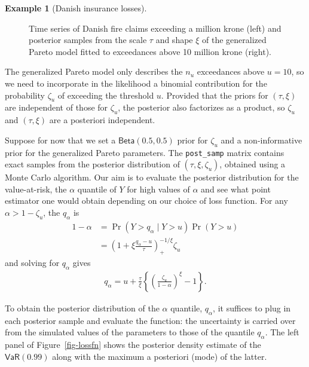 \documentclass[
  11pt,
  letterpaper,
]{scrbook}
\theoremstyle{definition}
\newtheorem{example}{Example}[chapter]
\theoremstyle{definition}
\theoremstyle{definition}
\theoremstyle{plain}
\theoremstyle{remark}
\begin{document}
\begin{example}[Danish insurance
losses]
\begin{figure}[ht!]
{}

\caption{\label{fig-danish}Time series of Danish fire claims exceeding a
million krone (left) and posterior samples from the scale \(\tau\) and
shape \(\xi\) of the generalized Pareto model fitted to exceedances
above 10 million krone (right).}

\end{figure}

The generalized Pareto model only describes the \(n_u\) exceedances
above \(u=10\), so we need to incorporate in the likelihood a binomial
contribution for the probability \(\zeta_u\) of exceeding the threshold
\(u\). Provided that the priors for \((\tau, \xi)\) are independent of
those for \(\zeta_u\), the posterior also factorizes as a product, so
\(\zeta_u\) and \((\tau, \xi)\) are a posteriori independent.

Suppose for now that we set a \(\mathsf{Beta}(0.5, 0.5)\) prior for
\(\zeta_u\) and a non-informative prior for the generalized Pareto
parameters. The \texttt{post\_samp} matrix contains exact samples from
the posterior distribution of \((\tau, \xi, \zeta_u)\), obtained using a
Monte Carlo algorithm. Our aim is to evaluate the posterior distribution
for the value-at-risk, the \(\alpha\) quantile of \(Y\) for high values
of \(\alpha\) and see what point estimator one would obtain depending on
our choice of loss function. For any \(\alpha > 1-\zeta_u\), the
\(q_{\alpha}\) is \begin{align*}
1- \alpha  &= \Pr(Y > q_\alpha \mid Y > u) \Pr(Y > u) 
\\ &= \left(1+\xi \frac{q_{\alpha}-u}{\tau}\right)_{+}^{-1/\xi}\zeta_u
\end{align*} and solving for \(q_{\alpha}\) gives \begin{align*}
q_{\alpha} = u+ \frac{\tau}{\xi} \left\{\left(\frac{\zeta_u}{1-\alpha}\right)^\xi-1\right\}.
\end{align*}

To obtain the posterior distribution of the \(\alpha\) quantile,
\(q_{\alpha}\), it suffices to plug in each posterior sample and
evaluate the function: the uncertainty is carried over from the
simulated values of the parameters to those of the quantile
\(q_{\alpha}\). The left panel of Figure~\ref{fig-lossfn} shows the
posterior density estimate of the \(\mathsf{VaR}(0.99)\) along with the
maximum a posteriori (mode) of the latter.


\end{example}
\end{document}
